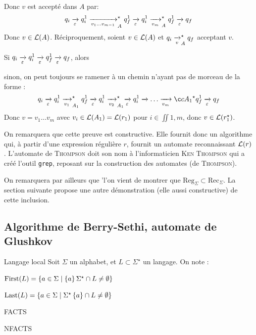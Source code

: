 \documentclass[a4paper,french,bookmarks]{book}
\begin{document}
\begin{nproof}
\begin{enumerate}
            Donc $v$ est accepté dans $A$ par:    
            \[ q_i \lima{\epsilon} q_i^1 \lima{v_1 \dots v_{m-1}}_A^\star q_f^1 \lima{\epsilon} q_i^1 \lima{v_m}_A^\star q_f^1 \lima{\epsilon} q_f \]
            Donc $v \in \mathcal{L}\!\left(A\right)$. Réciproquement, soient $v \in \mathcal{L}\!\left(A\right)$ et $q_i \lima{v}_A^\star q_f$ acceptant $v$.
            \begin{enumerate}
                \ithand Si $q_i \lima{\epsilon} q_i^1 \lima{\epsilon} q_f^1 \lima{\epsilon} q_f$, alors 
                
                \ithand 
                
                \ithand sinon, on peut toujours se ramener à un chemin n'ayant pas de morceau de la forme :
                \[ q_i \lima{\epsilon} q_i^1 \lima{v_1}_{A_1}^\star q_f^1 \lima{\epsilon} q_i^1 \lima{v_2}_{A_1}^\star \lima{\epsilon} q_i^1 \lima \dots \lima{v_m}ç{A_1}^\star q_f^1 \lima{\epsilon} q_f\]
                Donc $v =v_1 \dots v_m$ avec $v_i \in \mathcal{L}\!\left(A_1\right) = \mathcal{L}\!\left(r_1\right)$ pour $i \in \iint{1, m}$, donc $v \in \mathcal{L}\!\left(r_1^\star\right)$.
             \end{enumerate}
        \end{enumerate}
    \end{nproof}
    
    On remarquera que cette preuve est constructive. Elle fournit donc un algorithme qui, à partir d'une expression régulière $r$, fournit un automate reconnaissant $\mathcal{L}\!\left(r\right)$. L'automate de \textsc{Thompson} doit son nom à l'informaticien \textsc{Ken Thompson} qui a créé l'outil \texttt{grep}, reposant sur la construction des automates (de \textsc{Thompson}). 
    
    On remarquera par ailleurs que 'l'on vient de montrer que $\mathrm{Reg}_\Sigma \subset \mathrm{Rec}_\Sigma$. La section suivante propose une autre démonstration (elle aussi constructive) de cette inclusion.
    
    \subsection{Algorithme de Berry-Sethi, automate de Glushkov}
        
    \begin{definition}{Langage local}{}
        Soit $\Sigma$ un alphabet, et $L \subset \Sigma^\star$ un langage. On note :
        \begin{enumerate}
            \itast $\First\p{L} = \ens{a \in \Sigma \enstq \ens{a}\Sigma^\star \cap L \neq \emptyset}$
            
            \itast $\Last\p{L} = \ens{a \in \Sigma \enstq \Sigma^\star\ens{a} \cap L \neq \emptyset}$
            
            \itast FACTS
            
            \itast NFACTS
        \end{enumerate}
    \end{definition}
    
\end{document}
